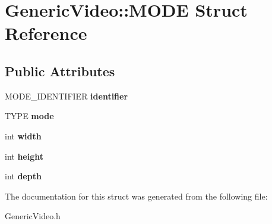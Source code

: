 \hypertarget{struct_generic_video_1_1_m_o_d_e}{}\section{Generic\+Video\+:\+:M\+O\+DE Struct Reference}
\label{struct_generic_video_1_1_m_o_d_e}
\subsection*{Public Attributes}
\begin{DoxyCompactItemize}
\item 
\mbox{\label{struct_generic_video_1_1_m_o_d_e_a8655bec4bebe7571c7883d29c708b50e}} 
M\+O\+D\+E\+\_\+\+I\+D\+E\+N\+T\+I\+F\+I\+ER {\bfseries identifier}
\item 
\mbox{\label{struct_generic_video_1_1_m_o_d_e_a2f820e4b258302b6dc86953b8f41de7c}} 
T\+Y\+PE {\bfseries mode}
\item 
\mbox{\label{struct_generic_video_1_1_m_o_d_e_a09d5f8583758a520c6653e594566a035}} 
int {\bfseries width}
\item 
\mbox{\label{struct_generic_video_1_1_m_o_d_e_a00577d08730c57c4c1100626179c381c}} 
int {\bfseries height}
\item 
\mbox{\label{struct_generic_video_1_1_m_o_d_e_ab5eca35dc5f7dda0bb571bc594186e6f}} 
int {\bfseries depth}
\end{DoxyCompactItemize}


The documentation for this struct was generated from the following file\+:\begin{DoxyCompactItemize}
\item 
Generic\+Video.\+h\end{DoxyCompactItemize}
